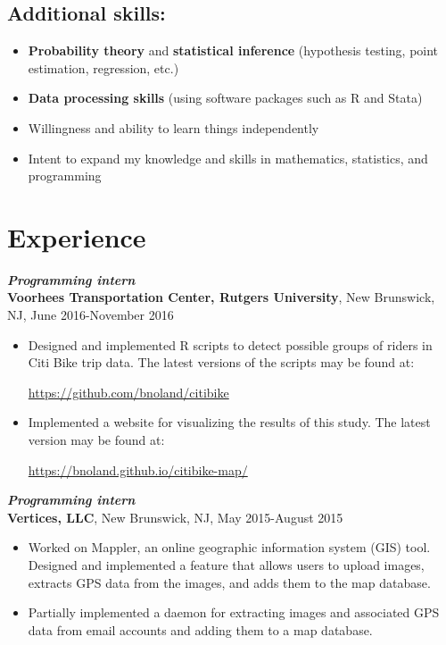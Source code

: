 \documentclass[12pt]{article}
\begin{document}
\subsection*{Additional skills:}

\begin{itemize}
\item
\textbf{Probability theory} and \textbf{statistical inference} (hypothesis testing, point estimation, regression, etc.)
\item
\textbf{Data processing skills} (using software packages such as R and Stata)
\item
Willingness and ability to learn things independently
\item
Intent to expand my knowledge and skills in mathematics, statistics, and programming
\end{itemize}

\section*{Experience}

\textit{\textbf{Programming intern}} \\
\textbf{Voorhees Transportation Center, Rutgers University}, New Brunswick, NJ, June 2016-November 2016
\begin{itemize}
\item
Designed and implemented R scripts to detect possible groups of riders in Citi Bike trip data. The latest versions of the scripts may be found at:
\begin{center}
\url{https://github.com/bnoland/citibike}
\end{center}

\item
Implemented a website for visualizing the results of this study. The latest version may be found at:
\begin{center}
\url{https://bnoland.github.io/citibike-map/}
\end{center}

\end{itemize}

\textit{\textbf{Programming intern}} \\
\textbf{Vertices, LLC}, New Brunswick, NJ, May 2015-August 2015
\begin{itemize}
\item
Worked on Mappler, an online geographic information system (GIS) tool. Designed and implemented a feature that allows users to upload images, extracts GPS data from the images, and adds them to the map database.
\item
Partially implemented a daemon for extracting images and associated GPS data from email accounts and adding them to a map database.
\end{itemize}
\end{document}
